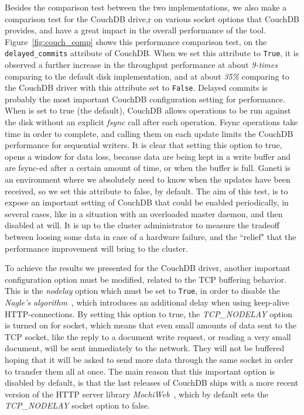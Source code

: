 Besides the comparison test between the two implementations, we also make
a comparison test for the CouchDB drive,r on various socket options that CouchDB
provides, and have a great impact in the overall performance of the tool.
Figure~\ref{fig:couch_comp} shows this performance comparison test, on the
\texttt{delayed\_commits} attribute of CouchDB. When we set this attribute to
\texttt{True}, it is observed a further increase in the throughput performance
at about \emph{9-times} comparing to the default disk implementation, and at
about \emph{35\%} comparing to the CouchDB driver with this attribute set to
\texttt{False}. Delayed commits is probably the most important CouchDB
configuration setting for performance. When is set to true (the default),
CouchDB allows operations to be run against the disk without an explicit
\emph{fsync} call after each operation. Fsync operations take time in order to
complete, and calling them on each update limits the CouchDB performance for
sequential writers. It is clear that setting this option to true, opens a
window for data loss, because data are being kept in a write buffer and are
fsync-ed after a certain amount of time, or when the buffer is full. Ganeti is
an environment where we absolutely need to know when the updates have been
received, so we set this attribute to false, by default. The aim of this
test, is to expose an important setting of CouchDB that could be enabled
periodically, in several cases, like in a situation with an overloaded master
daemon, and then disabled at will. It is up to the cluster administrator to
measure the tradeoff between loosing some data in case of a hardware failure,
and the ``relief" that the performance improvement will bring to the cluster.

To achieve the results we presented for the CouchDB driver, another
important configuration option must be modified, related to the TCP buffering
behavior. This is the \emph{nodelay} option which must be set to \texttt{True},
in order to disable the \emph{Nagle's algorithm}~, which introduces an additional delay when using
keep-alive HTTP-connections. By setting this option to true, the
\emph{TCP\_NODELAY} option is turned on for socket, which means that even small
amounts of data sent to the TCP socket, like the reply to a document write
request, or reading a very small document, will be sent immediately to the
network. They will not be buffered hoping that it will be asked to send more
data through the same socket in order to transfer them all at once. The main
reason that this important option is disabled by default, is that the last
releases of CouchDB ships with a more recent version of the HTTP server library
\emph{MochiWeb}~, which by default sets
the \emph{TCP\_NODELAY} socket option to false.

